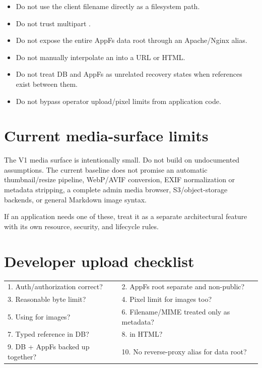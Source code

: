 \begin{itemize}
  \item Do not use the client filename directly as a filesystem path.
  \item Do not trust multipart .
  \item Do not expose the entire AppFs data root through an Apache/Nginx alias.
  \item Do not manually interpolate an  into a URL or HTML.
  \item Do not treat DB and AppFs as unrelated recovery states when references exist between them.
  \item Do not bypass operator upload/pixel limits from application code.
\end{itemize}

\section{Current media-surface limits}

The V1 media surface is intentionally small. Do not build on undocumented assumptions. The current baseline does not promise an automatic thumbnail/resize pipeline, WebP/AVIF conversion, EXIF normalization or metadata stripping, a complete admin media browser, S3/object-storage backends, or general Markdown image syntax.

If an application needs one of these, treat it as a separate architectural feature with its own resource, security, and lifecycle rules.

\section{Developer upload checklist}

{\small
\begin{tabularx}{\textwidth}{@{}Y Y@{}}
1. Auth/authorization correct? & 2. AppFs root separate and non-public? \\
3. Reasonable byte limit? & 4. Pixel limit for images too? \\
5. Using  for images? & 6. Filename/MIME treated only as metadata? \\
7. Typed reference in DB? & 8.  in HTML? \\
9. DB + AppFs backed up together? & 10. No reverse-proxy alias for data root? \\
\end{tabularx}
}
